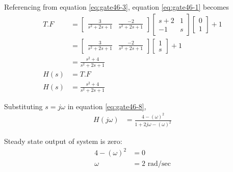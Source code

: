 \documentclass[a4,12pt,onecolumn]{IEEEtran}
\newcommand{\mybmat}[1]{\ensuremath{\begin{bmatrix}#1\end{bmatrix}}}
\begin{document}
Referencing from equation \eqref{eq:gate46-3}, equation \eqref{eq:gate46-1} becomes 
\begin{align}
T.F &= \mybmat{ \frac{3}{s^2+2s+1} & \frac{-2}{s^2+2s+1} } \mybmat {s+2 & 1 \\ -1 & s} \mybmat{0 \\ 1} + 1 \\
&= \mybmat{ \frac{3}{s^2+2s+1} & \frac{-2}{s^2+2s+1} }  \mybmat{1 \\ s} + 1 \\
&= \frac{s^2 + 4}{s^2 + 2s + 1} \\
H(s) &= T.F \\
H(s) &= \frac{s^2 + 4}{s^2+2s+1} \label{eq:gate46-8}
\end{align}

Substituting $s=j\omega$ in equation \eqref{eq:gate46-8},
\begin{align}
H(j\omega) &= \frac{4-(\omega)^2}{1+2j\omega-(\omega)^2}
\end{align}

Steady state output of system is zero:
\begin{align}
4-(\omega)^2 &= 0 \\
\omega &= 2 \text{ rad/sec}
\end{align}
\end{document}
